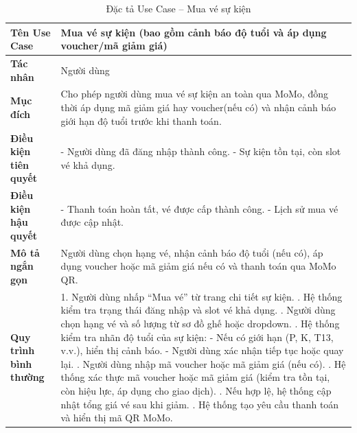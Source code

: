 \renewcommand{\arraystretch}{1.3}
\setlength{\tabcolsep}{8pt}
\begin{longtable}{|p{}|p{}|}
\caption{Đặc tả Use Case -- Mua vé sự kiện}
\label{tab:uc_ticket_purchase} \\
\hline
\textbf{Tên Use Case} & Mua vé sự kiện (bao gồm cảnh báo độ tuổi và áp dụng voucher/mã giảm giá) \\ \hline
\textbf{Tác nhân} & Người dùng \\ \hline
\textbf{Mục đích} & Cho phép người dùng mua vé sự kiện an toàn qua MoMo, đồng thời áp dụng mã giảm giá hay voucher(nếu có) và nhận cảnh báo giới hạn độ tuổi trước khi thanh toán. \\ \hline
\textbf{Điều kiện tiên quyết} &
- Người dùng đã đăng nhập thành công. \newline
- Sự kiện tồn tại, còn slot vé khả dụng. \\ \hline
\textbf{Điều kiện hậu quyết} &
- Thanh toán hoàn tất, vé được cấp thành công. \newline
- Lịch sử mua vé được cập nhật. \\ \hline
\textbf{Mô tả ngắn gọn} &
Người dùng chọn hạng vé, nhận cảnh báo độ tuổi (nếu có), áp dụng voucher hoặc mã giảm giá nếu có và thanh toán qua MoMo QR. \\ \hline
\textbf{Quy trình bình thường} &
1. Người dùng nhấp “Mua vé” từ trang chi tiết sự kiện. \newline
2. Hệ thống kiểm tra trạng thái đăng nhập và slot vé khả dụng. \newline
3. Người dùng chọn hạng vé và số lượng từ sơ đồ ghế hoặc dropdown. \newline
4. Hệ thống kiểm tra nhãn độ tuổi của sự kiện: \newline
\hspace*{1em}- Nếu có giới hạn (P, K, T13, v.v.), hiển thị cảnh báo. \newline
\hspace*{1em}- Người dùng xác nhận tiếp tục hoặc quay lại. \newline
5. Người dùng nhập mã voucher hoặc mã giảm giá (nếu có). \newline
6. Hệ thống xác thực mã voucher hoặc mã giảm giá (kiểm tra tồn tại, còn hiệu lực, áp dụng cho giao dịch). \newline
7. Nếu hợp lệ, hệ thống cập nhật tổng giá vé sau khi giảm. \newline
8. Hệ thống tạo yêu cầu thanh toán và hiển thị mã QR MoMo. \newline

\end{longtable}
